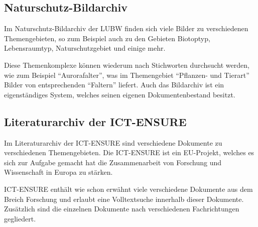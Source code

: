 \subsection{Naturschutz-Bildarchiv} \label{Bilddatenbank}
Im Naturschutz-Bildarchiv der \ac{LUBW} finden sich viele Bilder zu verschiedenen Themengebieten, so zum Beispiel auch zu den Gebieten Biotoptyp, Lebensraumtyp, Naturschutzgebiet und einige mehr.
\cite{Naturschutz-Bildarchiv}

Diese Themenkomplexe k\"onnen wiederum nach Stichworten durchsucht werden, wie zum Beispiel "`Aurorafalter"', was im Themengebiet "`Pflanzen- und Tierart"' Bilder von entsprechenden "`Faltern"' liefert. Auch das Bildarchiv ist ein eigenst\"andiges System, welches seinen eigenen Dokumentenbestand besitzt.

\subsection{Literaturarchiv der ICT-ENSURE}
Im Literaturarchiv der \ac{ICT-ENSURE} sind verschiedene Dokumente zu verschiedenen Themengebieten. Die \ac{ICT-ENSURE} ist ein EU-Projekt, welches es sich zur Aufgabe gemacht hat die Zusammenarbeit von Forschung und Wissenschaft in Europa zu st\"arken.

\ac{ICT-ENSURE} enth\"alt wie schon erw\"ahnt viele verschiedene Dokumente aus dem Breich Forschung und erlaubt eine Volltextsuche innerhalb dieser Dokumente. Zus\"atzlich sind die einzelnen Dokumente nach verschiedenen Fachrichtungen gegliedert.
\cite{ICT-ENSURE_Bericht}
